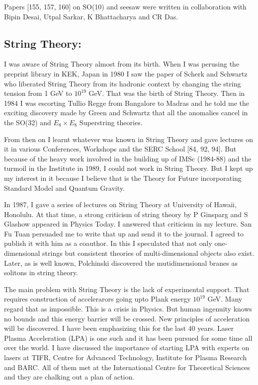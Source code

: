 Papers [155, 157, 160] on SO(10) and seesaw were written in collaboration 
with Bipin Desai, Utpal Sarkar, K Bhattacharya and CR Das.

\vspace{-\topsep}
\subsection*{String Theory:}

I was aware of String Theory almost from its birth. When I was perusing 
the preprint library in KEK, Japan in 1980 I saw the paper of Scherk and 
Schwartz who liberated String Theory from its hadronic context by 
changing the string tension from 1 GeV to $10^{19}$ GeV. That was the birth 
of String Theory. Then in 1984 I was escorting Tullio Regge from 
Bangalore to Madras and he told me the exciting discovery made by Green 
and Schwartz that all the anomalies cancel in the SO(32) and $E_8 \times E_8$ 
Superstring theories.

From then on I learnt whatever was known in String Theory and gave 
lectures on it in various Conferences, Workshops and the SERC School 
[84, 92, 94]. But because of the heavy work involved in the building up of 
IMSc (1984-88) and the turmoil in the Institute in 1989, I could not 
work in String Theory. But I kept up my interest in it because I believe 
that is the Theory for Future incorporating Standard Model and Quantum 
Gravity.

In 1987, I gave a series of lectures on String Theory at University of 
Hawaii, Honolulu. At that time, a strong criticism of string theory by P 
Ginsparg and S Glashow appeared in Physics Today. I answered that 
criticism in my lecture. San Fu Tuan persuaded me to write that up and 
send it to the journal. I agreed to publish it with him as a coauthor. 
In this I speculated that not only one-dimensional strings but 
consistent theories of multi-dimensional objects also exist. Later, as 
is well known, Polchinski discovered the mutidimensional branes as 
solitons in string theory.


The main problem with String Theory is the lack of experi\-mental support. 
That requires construction of accelerarors going upto Plank energy $10^{19}$ 
GeV. Many regard that as impossible. This is a crisis in Physics. But 
human ingenuity knows no bounds and this energy barrier will be crossed. 
New principles of accele\-ration will be discovered. I have been 
emphasizing this for the last 40 years. Laser Plasma Acceleration (LPA) 
is one such and it has been pursued for some time all over the world. I 
have discussed the importance of starting LPA with experts on lasers at 
TIFR, Centre for Advanced Technology, Institute for Plasma Research and 
BARC. All of them met at the International Centre for Theoretical 
Sciences and they are chalking out a plan of action.
\vspace{-\topsep}
